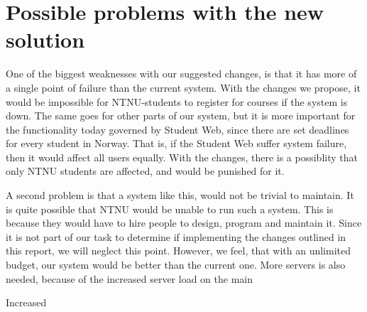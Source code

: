 \chapter{Possible problems with the new solution}
One of the biggest weaknesses with our suggested changes, is that it has more of a single point of failure than the current system. With the changes we propose, it would be impossible for NTNU-students to register for courses if the system is down. The same goes for other parts of our system, but it is more important for the functionality today governed by Student Web, since there are set deadlines for every student in Norway. That is, if the Student Web suffer system failure, then it would affect all users equally. With the changes, there is a possiblity that only NTNU students are affected, and would be punished for it. 

A second problem is that a system like this, would not be trivial to maintain. It is quite possible that NTNU would be unable to run such a system. This is because they would have to hire people to design, program and maintain it. Since it is not part of our task to determine if implementing the changes outlined in this report, we will neglect this point. However,  we feel, that with an unlimited budget, our system would be better than the current one. More servers is also needed, because of the increased server load on the main

Increased 